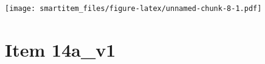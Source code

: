 \documentclass[]{book}
\newenvironment{Shaded}{\begin{snugshade}}{\end{snugshade}}
\newcommand{\KeywordTok}[1]{\textcolor[rgb]{0.13,0.29,0.53}{\textbf{#1}}}
\newcommand{\DataTypeTok}[1]{\textcolor[rgb]{0.13,0.29,0.53}{#1}}
\newcommand{\StringTok}[1]{\textcolor[rgb]{0.31,0.60,0.02}{#1}}
\newcommand{\OperatorTok}[1]{\textcolor[rgb]{0.81,0.36,0.00}{\textbf{#1}}}
\newcommand{\NormalTok}[1]{#1}
\theoremstyle{definition}
\theoremstyle{definition}
\theoremstyle{definition}
\theoremstyle{remark}
\begin{document}
\texttt{[image: smartitem\_files/figure-latex/unnamed-chunk-8-1.pdf]}

\section{Item 14a\_v1}\label{item-14a_v1}

\begin{Shaded}
\end{Shaded}
\end{document}
